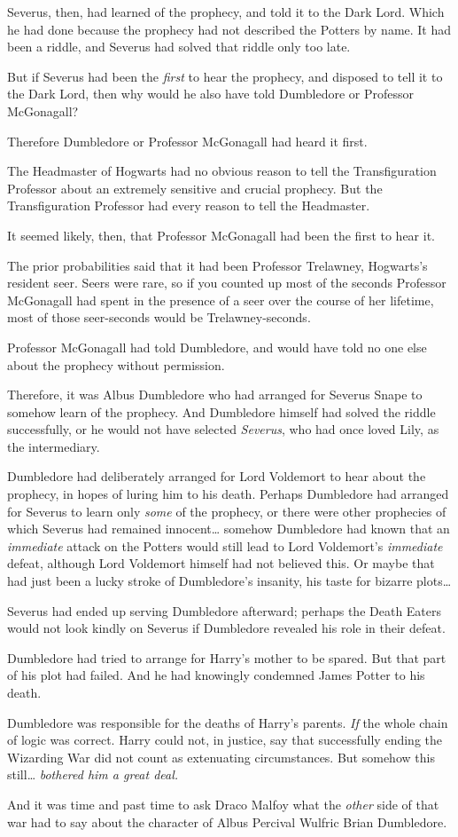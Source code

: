 Severus, then, had learned of the prophecy, and told it to the Dark Lord. Which 
he had done because the prophecy had not described the Potters by name. It had 
been a riddle, and Severus had solved that riddle only too late.

But if Severus had been the \emph{first} to hear the prophecy, and disposed to 
tell it to the Dark Lord, then why would he also have told Dumbledore or 
Professor McGonagall?

Therefore Dumbledore or Professor McGonagall had heard it first.

The Headmaster of Hogwarts had no obvious reason to tell the Transfiguration 
Professor about an extremely sensitive and crucial prophecy. But the 
Transfiguration Professor had every reason to tell the Headmaster.

It seemed likely, then, that Professor McGonagall had been the first to hear it.

The prior probabilities said that it had been Professor Trelawney, Hogwarts's 
resident seer. Seers were rare, so if you counted up most of the seconds 
Professor McGonagall had spent in the presence of a seer over the course of her 
lifetime, most of those seer-seconds would be Trelawney-seconds.

Professor McGonagall had told Dumbledore, and would have told no one else about 
the prophecy without permission.

Therefore, it was Albus Dumbledore who had arranged for Severus Snape to 
somehow learn of the prophecy. And Dumbledore himself had solved the riddle 
successfully, or he would not have selected \emph{Severus}, who had once loved 
Lily, as the intermediary.

Dumbledore had deliberately arranged for Lord Voldemort to hear about the 
prophecy, in hopes of luring him to his death. Perhaps Dumbledore had arranged 
for Severus to learn only \emph{some} of the prophecy, or there were other 
prophecies of which Severus had remained innocent{\ldots} somehow Dumbledore 
had known that an \emph{immediate} attack on the Potters would still lead to 
Lord Voldemort's \emph{immediate} defeat, although Lord Voldemort himself had 
not believed this. Or maybe that had just been a lucky stroke of Dumbledore's 
insanity, his taste for bizarre plots{\ldots}

Severus had ended up serving Dumbledore afterward; perhaps the Death Eaters 
would not look kindly on Severus if Dumbledore revealed his role in their 
defeat.

Dumbledore had tried to arrange for Harry's mother to be spared. But that part 
of his plot had failed. And he had knowingly condemned James Potter to his 
death.

Dumbledore was responsible for the deaths of Harry's parents. \emph{If} the 
whole chain of logic was correct. Harry could not, in justice, say that 
successfully ending the Wizarding War did not count as extenuating 
circumstances. But somehow this still{\ldots} \emph{bothered him a great deal.}

And it was time and past time to ask Draco Malfoy what the \emph{other} side of 
that war had to say about the character of Albus Percival Wulfric Brian 
Dumbledore.
